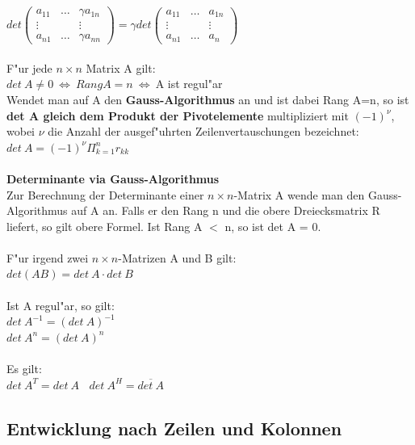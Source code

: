 \documentclass[10pt, a4paper, twocolumn]{scrartcl}
\begin{document}
\tiny
$ 
det \left (
\begin{array}{ccc}
a_{11} &  \ldots & \gamma a_{1n}\\
\vdots &         & \vdots\\
a_{n1} &  \ldots & \gamma a_{nn}
\end{array}
\right )
=
\gamma det \left (
\begin{array}{ccc}
a_{11} &  \ldots & a_{1n}\\
\vdots &         & \vdots\\
a_{n1} &  \ldots & a_{n}
\end{array}
\right )
$\normalsize\\\\


F"ur jede $n\times n$ Matrix A gilt:\\
$det\:A \neq 0\: \Leftrightarrow\:Rang A = n \:\Leftrightarrow\:$A ist regul"ar\\

Wendet man auf A den {\bf Gauss-Algorithmus} an und ist dabei Rang A=n, so ist {\bf det A gleich dem Produkt der Pivotelemente} multipliziert mit $(-1)^\nu$, wobei $\nu$ die Anzahl der ausgef"uhrten Zeilenvertauschungen bezeichnet:\\
$det\:A = (-1)^\nu \Pi^n_{k=1}r_{kk}$\\\\

\textbf{Determinante via Gauss-Algorithmus}\\
Zur Berechnung der Determinante einer $n\times n$-Matrix A wende man den Gauss-Algorithmus auf A an. Falls er den Rang n und die obere Dreiecksmatrix R liefert, so gilt obere Formel. Ist Rang A $<$ n, so ist det A = 0.\\\\

F"ur irgend zwei $n\times n$-Matrizen A und B gilt:\\
$det(AB)=det\:A \cdot det\:B$\\\\

Ist A regul"ar, so gilt:\\
$det\:A^{-1}=(det\:A)^{-1}$\\
$det\:A^{n}=(det\:A)^{n}$\\\\

Es gilt:\\
$det\:A^T = det\:A\:\:\:\:det\:A^H=\overline{det\:A}$

\subsection{Entwicklung nach Zeilen und Kolonnen}
\end{document}
